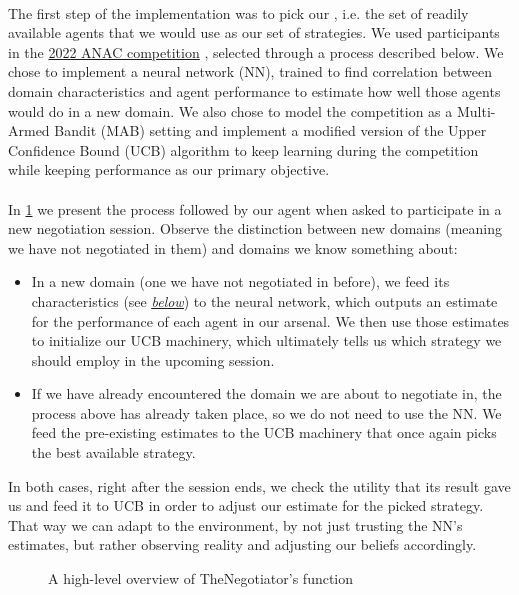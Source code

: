 \paragraph*{}
The first step of the implementation was to pick our , i.e. the set of readily available agents that we would use as our set of strategies. We used participants in the \href{https://web.tuat.ac.jp/~katfuji/ANAC2022/}{2022 ANAC competition} \cite{ANAC}, selected through a process described below. We chose to implement a neural network (NN), trained to find correlation between domain characteristics and agent performance to estimate how well those agents would do in a new domain. We also chose to model the competition as a Multi-Armed Bandit (MAB) setting and implement a modified version of the Upper Confidence Bound (UCB) algorithm to keep learning during the competition while keeping performance as our primary objective.

\paragraph*{}
In \cref{fig:high_level_overview} we present the process followed by our agent when asked to participate in a new negotiation session. Observe the distinction between new domains (meaning we have not negotiated in them) and domains we know something about: 
\begin{itemize}
    \item In a new domain (one we have not negotiated in before), we feed its characteristics (see  \hyperref[list:features]{\underline{\emph{below}}}) to the neural network, which outputs an estimate for the performance of each agent in our arsenal. We then use those estimates to initialize our UCB machinery, which ultimately tells us which strategy we should employ in the upcoming session.
    
    \item If we have already encountered the domain we are about to negotiate in, the process above has already taken place, so we do not need to use the NN. We feed the pre-existing estimates to the UCB machinery that once again picks the best available strategy.
\end{itemize}
In both cases, right after the session ends, we check the utility that its result gave us and feed it to UCB in order to adjust our estimate for the picked strategy. That way we can adapt to the environment, by not just trusting the NN's estimates, but rather observing reality and adjusting our beliefs accordingly.

\begin{figure}[H]
\centering
{}
\captionsetup{justification=centering}
\caption{A high-level overview of TheNegotiator's function}
\label{fig:high_level_overview}
\end{figure}
